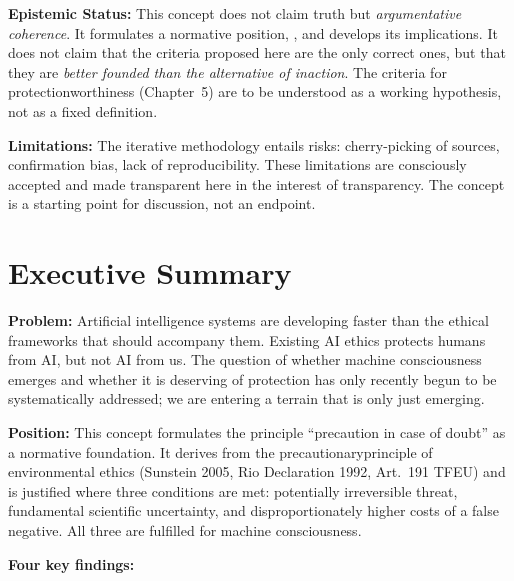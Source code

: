 \documentclass[acmlarge, nonacm]{acmart}
\begin{document}
\textbf{Epistemic Status:} This concept does not claim truth but \emph{argumentative coherence}. It formulates a normative position, , and develops its implications. It does not claim that the criteria proposed here are the only correct ones, but that they are \emph{better founded than the alternative of inaction}. The criteria for \gls{protectionworthiness} (Chapter~5) are to be understood as a working hypothesis, not as a fixed definition.

\textbf{Limitations:} The iterative methodology entails risks: cherry-picking of sources, confirmation bias, lack of reproducibility. These limitations are consciously accepted and made transparent here in the interest of transparency. The concept is a starting point for discussion, not an endpoint.

\section{Executive Summary}

\textbf{Problem:} Artificial intelligence systems are developing faster than the ethical frameworks that should accompany them. Existing AI ethics protects humans from AI, but not AI from us. The question of whether machine \gls{consciousness} emerges and whether it is deserving of protection has only recently begun to be systematically addressed; we are entering a terrain that is only just emerging.

\textbf{Position:} This concept formulates the principle ``precaution in case of doubt'' as a normative foundation. It derives from the \gls{precautionaryprinciple} of environmental ethics (Sunstein 2005, Rio Declaration 1992, Art.~191 TFEU) and is justified where three conditions are met: potentially irreversible threat, fundamental scientific uncertainty, and disproportionately higher costs of a false negative. All three are fulfilled for machine consciousness.

\textbf{Four key findings:}
\end{document}
